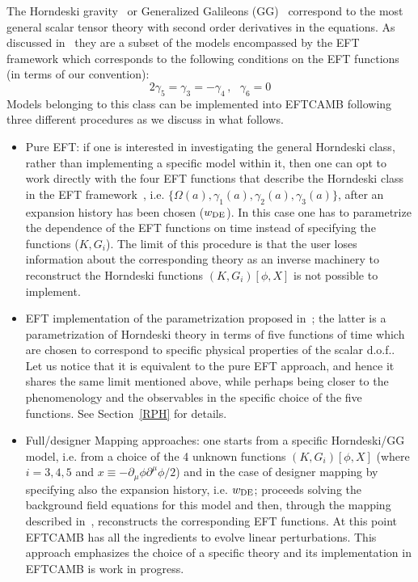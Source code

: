 \documentclass[prd,nofootinbib,showpacs]{revtex4}
\def\be{\begin{equation}}
\def\ee{\end{equation}}
\begin{document}
{The Horndeski gravity~\cite{Horndeski:1974wa} or  Generalized Galileons (GG)~\cite{Deffayet:2009mn} correspond to the most general scalar tensor theory with second order derivatives in the equations. As discussed in~\cite{Gleyzes:2013ooa,Bloomfield:2013efa} they are a subset of the models encompassed by the EFT framework which corresponds to the following conditions on the EFT functions (in terms of our convention):
\be\label{Horndeski_condition}
2\gamma_5=\gamma_3=-\gamma_4\,,\,\,\,\,\gamma_6=0
\ee
Models belonging to this class can be implemented into EFTCAMB following three different procedures as we discuss in what follows. 
\begin{itemize}
\item Pure EFT: if one is interested in investigating the general Horndeski class, rather than implementing a specific model within it, then one can opt to work directly with the four EFT functions that describe the Horndeski class in the EFT framework~\cite{Bloomfield:2013efa}, i.e. $\{\Omega(a), \gamma_1(a),\gamma_2(a),\gamma_3(a)\}$, after an expansion history has been chosen ($w_{\rm DE}$). In this case one has to parametrize the dependence of the EFT functions on time instead of specifying the functions  ($K,G_i$).  The limit of this procedure is that the user loses information about the corresponding theory as an inverse machinery to reconstruct the Horndeski functions $(K,G_i)[\phi,X]$ is not possible to implement.    
\item  EFT implementation of the parametrization proposed in~\cite{Bellini:2014fua}; the latter is a parametrization of Horndeski theory in terms  of five functions of time which are chosen to correspond to specific physical properties of the scalar d.o.f.. Let us notice that it is equivalent to the pure EFT approach, and hence it shares the same limit mentioned above, while perhaps being closer to the phenomenology and the observables in the specific choice of the five functions. See Section~\ref{RPH} for details. 
\item Full/designer Mapping approaches: one starts from a specific Horndeski/GG model, i.e. from a choice of the 4 unknown  functions $(K,G_i)[\phi,X]$ (where $i=3,4,5$ and $x\equiv -\partial_\mu \phi\partial^\mu\phi/2$) and in the case of designer mapping by specifying also the expansion history, i.e. $w_{\rm DE}$; proceeds solving the background field equations for this model and then, through the mapping described in~\cite{Gleyzes:2013ooa,Bloomfield:2013efa}, reconstructs the corresponding EFT functions. At this point EFTCAMB has all the ingredients to evolve linear perturbations. This approach emphasizes the choice of a specific theory and its implementation in EFTCAMB is work in progress.
\end{itemize}

}
\end{document}
